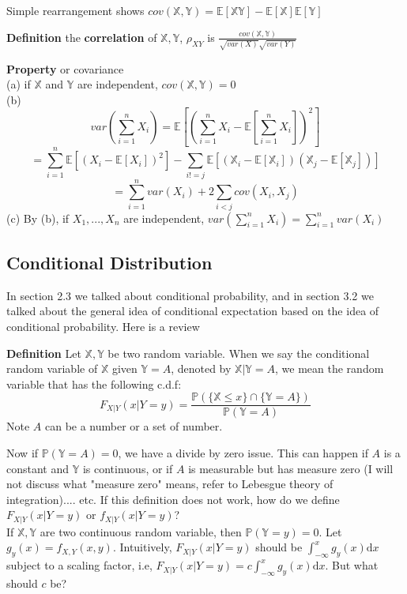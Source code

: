 \documentclass[a4paper,12pt]{article}
\begin{document}
Simple rearrangement shows $cov( \mathbb{X}, \mathbb{Y} ) = \mathbb{E}[\mathbb{X}\mathbb{Y}] - \mathbb{E}[\mathbb{X}]\mathbb{E}[\mathbb{Y}]$

\textbf{Definition} the \textbf{correlation} of $\mathbb{X}, \mathbb{Y}$, $\rho_{XY}$ is
$\frac{cov( \mathbb{X}, \mathbb{Y} )}{\sqrt{var(X)}\sqrt{var(Y)}}$

\textbf{Property} or covariance\\
(a) if $\mathbb{X}$ and $\mathbb{Y}$ are independent, $cov( \mathbb{X}, \mathbb{Y} ) = 0$\\
(b) $$var(\sum_{i=1}^n X_i) = \mathbb{E}[(\sum_{i=1}^n X_i - \mathbb{E}[\sum_{i=1}^n X_i])^2]$$
$$= \sum_{i=1}^n \mathbb{E}[ (X_i - \mathbb{E}[X_i])^2 ] - \sum_{i!=j}\mathbb{E}[ (\mathbb{X}_i - \mathbb{E}[\mathbb{X}_i])(\mathbb{X}_j - \mathbb{E}[\mathbb{X}_j]) ]$$
$$= \sum_{i=1}^n var(X_i) + 2 \sum_{i<j}cov(X_i, X_j)$$
(c) By (b), if $X_1, ..., X_n$ are independent, $var(\sum_{i=1}^n X_i) = \sum_{i=1}^n var(X_i)$\\

\subsection{Conditional Distribution}
In section 2.3 we talked about conditional probability, and in section 3.2 we talked about the general idea of conditional expectation based on the idea of conditional probability. Here is a review

\textbf{Definition} Let $\mathbb{X}, \mathbb{Y}$ be two random variable. When we say the conditional random variable of $\mathbb{X}$ given $\mathbb{Y} = A$, denoted by $\mathbb{X}|{\mathbb{Y}=A} $, we mean the random variable that has the following c.d.f:
$$F_{X|Y}(x|Y=y) = \frac{\mathbb{P}( \{\mathbb{X} \leq x\} \cap \{\mathbb{Y} = A\} )}{\mathbb{P}(\mathbb{Y} = A)} $$
Note $A$ can be a number or a set of number.

Now if  $\mathbb{P}(\mathbb{Y} = A) = 0$, we have a divide by zero issue. This can happen if $A$ is a constant and $\mathbb{Y}$ is continuous, or if $A$ is measurable but has measure zero (I will not discuss what "measure zero" means, refer to Lebesgue theory of integration).... etc. If this definition does not work, how do we define $F_{X|Y}(x|Y=y)$ or $f_{X|Y}(x|Y=y)$?\\

If $\mathbb{X}, \mathbb{Y}$ are two continuous random variable, then $\mathbb{P}(\mathbb{Y} = y) = 0$. Let $g_y(x) = f_{X, Y}(x, y)$. Intuitively, $F_{X|Y}(x|Y=y)$ should be $\int_{-\infty}^x g_y(x) \mathrm{d}x$ subject to a scaling factor, i.e, $F_{X|Y}(x|Y=y) = c\int_{-\infty}^x g_y(x) \mathrm{d}x$. But what should $c$ be?
\end{document}
